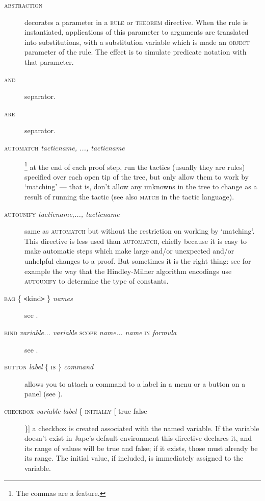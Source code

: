 \begin{description}
\item[\textsc{abstraction}] decorates a parameter in a \textsc{rule} or \textsc{theorem} directive. When the rule is instantiated, applications of this parameter to arguments are translated into substitutions, with a substitution variable which is made an \textsc{object} parameter of the rule. The effect is to simulate predicate notation with that parameter.

\item[\textsc{and}] separator.

\item[\textsc{are}] separator.

\item[\textsc{automatch} \textit{tacticname, ..., tacticname}]\footnote{The commas are a feature.} at the end of each proof step, run the tactics (usually they are rules) specified over each open tip of the tree, but only allow them to work by `matching' --- that is, don't allow any unknowns in the tree to change as a result of running the tactic (see also \textsc{match} in the tactic language).

\item[\textsc{autounify} \textit{tacticname,..., tacticname}] same as \textsc{automatch} but without the restriction on working by `matching'. This directive is less used than \textsc{automatch}, chiefly because it is easy to make automatic steps which make large and/or unexpected and/or unhelpful changes to a proof. But sometimes it is the right thing: see for example the way that the Hindley-Milner algorithm encodings use \textsc{autounify} to determine the type of constants.

\item[\textsc{bag \{} \texttt{<}kind\texttt{>} \textsc{\}} \textit{names}] see .


\item[\textsc{bind} \textit{variable... variable} \textsc{scope} \textit{name... name} \textsc{in} \textit{formula}] see .

\item[\textsc{button} \textit{label} \{ \textsc{is} \} \textit{command}] allows you to attach a command to a label in a menu or a button on a panel (see ).

\item[\textsc{checkbox} \textit{variable label} \{ \textsc{initially [} true {\textbar} false ] \}] a checkbox is created associated with the named variable. If the variable doesn't exist in Jape's default environment this directive declares it, and its range of values will be true and false; if it exists, those must already be its range. The initial value, if included, is immediately assigned to the variable.


\end{description}
